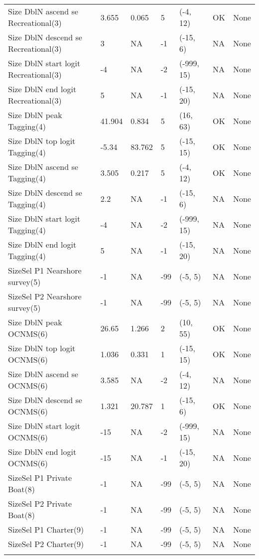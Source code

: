 \documentclass[11pt,
  letterpaper,
]{article}
\begin{document}
\begin{landscape}
\begin{longtable}[t]{>{\raggedright\arraybackslash}p{7.5cm}lllll>{\raggedright\arraybackslash}p{3.5cm}}
Size DblN ascend se Recreational(3) & 3.655 & 0.065 & 5 & (-4, 12) & OK & None\\
Size DblN descend se Recreational(3) & 3 & NA & -1 & (-15, 6) & NA & None\\
Size DblN start logit Recreational(3) & -4 & NA & -2 & (-999, 15) & NA & None\\
Size DblN end logit Recreational(3) & 5 & NA & -1 & (-15, 20) & NA & None\\
Size DblN peak Tagging(4) & 41.904 & 0.834 & 5 & (16, 63) & OK & None\\
Size DblN top logit Tagging(4) & -5.34 & 83.762 & 5 & (-15, 15) & OK & None\\
Size DblN ascend se Tagging(4) & 3.505 & 0.217 & 5 & (-4, 12) & OK & None\\
Size DblN descend se Tagging(4) & 2.2 & NA & -1 & (-15, 6) & NA & None\\
Size DblN start logit Tagging(4) & -4 & NA & -2 & (-999, 15) & NA & None\\
Size DblN end logit Tagging(4) & 5 & NA & -1 & (-15, 20) & NA & None\\
SizeSel P1 Nearshore survey(5) & -1 & NA & -99 & (-5, 5) & NA & None\\
SizeSel P2 Nearshore survey(5) & -1 & NA & -99 & (-5, 5) & NA & None\\
Size DblN peak OCNMS(6) & 26.65 & 1.266 & 2 & (10, 55) & OK & None\\
Size DblN top logit OCNMS(6) & 1.036 & 0.331 & 1 & (-15, 15) & OK & None\\
Size DblN ascend se OCNMS(6) & 3.585 & NA & -2 & (-4, 12) & NA & None\\
Size DblN descend se OCNMS(6) & 1.321 & 20.787 & 1 & (-15, 6) & OK & None\\
Size DblN start logit OCNMS(6) & -15 & NA & -2 & (-999, 15) & NA & None\\
Size DblN end logit OCNMS(6) & -15 & NA & -1 & (-15, 20) & NA & None\\
SizeSel P1 Private Boat(8) & -1 & NA & -99 & (-5, 5) & NA & None\\
SizeSel P2 Private Boat(8) & -1 & NA & -99 & (-5, 5) & NA & None\\
SizeSel P1 Charter(9) & -1 & NA & -99 & (-5, 5) & NA & None\\
SizeSel P2 Charter(9) & -1 & NA & -99 & (-5, 5) & NA & None\\*
\end{longtable}
\endgroup{}
\end{landscape}
\endgroup{}
\end{document}
